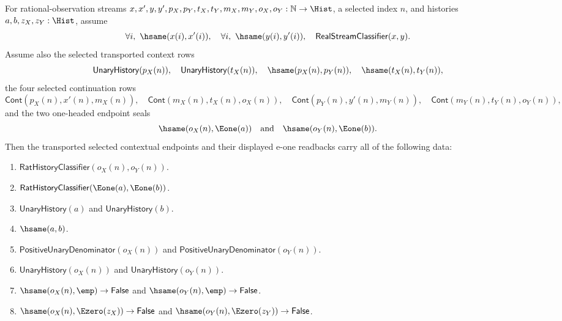 \begin{theorem}
\label{thm:real-stream-classifier-transported-contextual-displayed-e1-classifier-package}
For rational-observation streams
$x,x',y,y',p_X,p_Y,t_X,t_Y,m_X,m_Y,o_X,o_Y:\mathbb{N}\to\Hist$, a selected
index $n$, and histories $a,b,z_X,z_Y:\Hist$, assume
$$
\forall i,\ \hsame(x(i),x'(i)),\quad
\forall i,\ \hsame(y(i),y'(i)),\quad
\mathsf{RealStreamClassifier}(x,y).
$$
Assume also the selected transported context rows
$$
\mathsf{UnaryHistory}(p_X(n)),\quad
\mathsf{UnaryHistory}(t_X(n)),\quad
\hsame(p_X(n),p_Y(n)),\quad
\hsame(t_X(n),t_Y(n)),
$$
the four selected continuation rows
$$
\mathsf{Cont}(p_X(n),x'(n),m_X(n)),\quad
\mathsf{Cont}(m_X(n),t_X(n),o_X(n)),
\quad
\mathsf{Cont}(p_Y(n),y'(n),m_Y(n)),\quad
\mathsf{Cont}(m_Y(n),t_Y(n),o_Y(n)),
$$
and the two one-headed endpoint seals
$$
\hsame(o_X(n),\Eone(a))\quad\text{and}\quad \hsame(o_Y(n),\Eone(b)).
$$
Then the transported selected contextual endpoints and their displayed e-one
readbacks carry all of the following data:
\begin{enumerate}
\item $\mathsf{RatHistoryClassifier}(o_X(n),o_Y(n))$.
\item $\mathsf{RatHistoryClassifier}(\Eone(a),\Eone(b))$.
\item $\mathsf{UnaryHistory}(a)$ and $\mathsf{UnaryHistory}(b)$.
\item $\hsame(a,b)$.
\item $\mathsf{PositiveUnaryDenominator}(o_X(n))$ and
$\mathsf{PositiveUnaryDenominator}(o_Y(n))$.
\item $\mathsf{UnaryHistory}(o_X(n))$ and $\mathsf{UnaryHistory}(o_Y(n))$.
\item $\hsame(o_X(n),\emp)\to\mathsf{False}$ and
$\hsame(o_Y(n),\emp)\to\mathsf{False}$.
\item $\hsame(o_X(n),\Ezero(z_X))\to\mathsf{False}$ and
$\hsame(o_Y(n),\Ezero(z_Y))\to\mathsf{False}$.
\end{enumerate}
\end{theorem}
